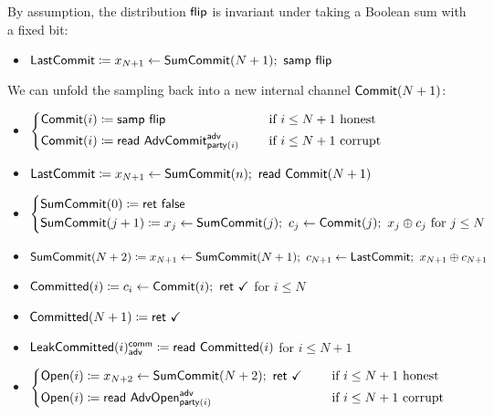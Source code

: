 \noindent By assumption, the distribution $\mathsf{flip}$ is invariant under taking a Boolean sum with a fixed bit:

\begin{itemize}
\item $\mathsf{LastCommit} \coloneqq x_{N+1} \leftarrow \mathsf{SumCommit}(N+1); \ \mathsf{samp} \ \mathsf{flip}$
\end{itemize}

\noindent We can unfold the sampling back into a new internal channel $\mathsf{Commit}(N+1)$:

\begin{itemize}
\item {\color{blue} $\begin{cases*} \Commit(i) \coloneqq \samp{\flip} & \hspace{10pt} \text{if $i \leq N+1$ honest} \\ \Commit(i) \coloneqq \read{\AdvCommit^\adv_{\party(i)}} & \hspace{10pt} \text{if $i \leq N+1$ corrupt} \end{cases*}$}
\item {\color{blue} $\mathsf{LastCommit} \coloneqq x_{N+1} \leftarrow \mathsf{SumCommit}(n); \ \mathsf{read} \ \mathsf{Commit}(N+1)$}
\item {\color{blue} $\begin{cases*} \SumCommit(0) \coloneqq \ret{\false} \\ \SumCommit(j+1) \coloneqq x_j \leftarrow \SumCommit(j); \ c_j \leftarrow \Commit(j); \ x_j \oplus c_j \text{ for $j \leq N$} \end{cases*}$}
\item {\color{blue} $\SumCommit(N+2) \coloneqq x_{N+1} \leftarrow \SumCommit(N+1); \ c_{N+1} \leftarrow \LastCommit; \ x_{N+1} \oplus c_{N+1}$}
\item {\color{magenta} $\mathsf{Committed}(i) \coloneqq c_i \leftarrow \mathsf{Commit}(i); \ \mathsf{ret} \ \checkmark$ for $i \leq N$}
\item {\color{magenta} $\mathsf{Committed}(N+1) \coloneqq \mathsf{ret} \ \checkmark$}
\item {\color{magenta} $\mathsf{LeakCommitted}(i)^{\mathsf{comm}}_{\mathsf{adv}} \coloneqq \mathsf{read} \ \mathsf{Committed}(i)$ for $i \leq N+1$}
\item {\color{teal} $\begin{cases*} \Open(i) \coloneqq x_{N+2} \leftarrow \SumCommit(N+2); \ \ret{\checkmark} & \hspace{10pt} \text{if $i \leq N+1$ honest} \\ \Open(i) \coloneqq \read{\AdvOpen^\adv_{\party(i)}} & \hspace{10pt} \text{if $i \leq N+1$ corrupt} \end{cases*}$}

\end{itemize}
